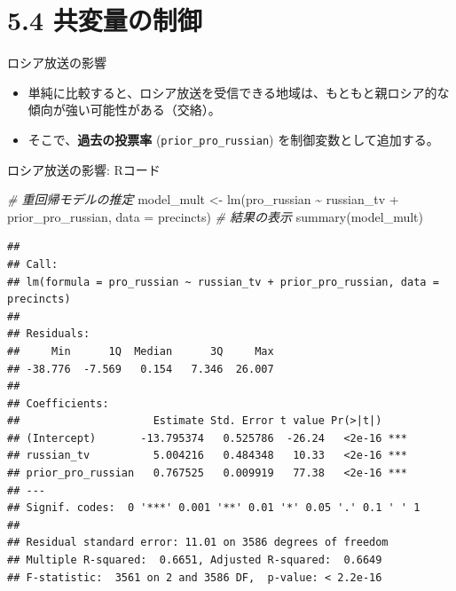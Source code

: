 \documentclass[
  ignorenonframetext,
]{beamer}
\newenvironment{Shaded}{\begin{snugshade}}{\end{snugshade}}
\newcommand{\AttributeTok}[1]{\textcolor[rgb]{0.77,0.63,0.00}{#1}}
\newcommand{\CommentTok}[1]{\textcolor[rgb]{0.56,0.35,0.01}{\textit{#1}}}
\newcommand{\FunctionTok}[1]{\textcolor[rgb]{0.00,0.00,0.00}{#1}}
\newcommand{\NormalTok}[1]{#1}
\newcommand{\OtherTok}[1]{\textcolor[rgb]{0.56,0.35,0.01}{#1}}
\newcommand{\SpecialCharTok}[1]{\textcolor[rgb]{0.00,0.00,0.00}{#1}}
\providecommand{\tightlist}{%
  \setlength{\itemsep}{0pt}\setlength{\parskip}{0pt}}
\begin{document}
\hypertarget{ux5171ux5909ux91cfux306eux5236ux5fa1}{%
\section{5.4 共変量の制御}\label{ux5171ux5909ux91cfux306eux5236ux5fa1}}

\begin{frame}[fragile]{ロシア放送の影響}
\protect\hypertarget{ux30edux30b7ux30a2ux653eux9001ux306eux5f71ux97ff}{}
\begin{itemize}
\tightlist
\item
  単純に比較すると、ロシア放送を受信できる地域は、もともと親ロシア的な傾向が強い可能性がある（交絡）。
\item
  そこで、\textbf{過去の投票率} (\texttt{prior\_pro\_russian})
  を制御変数として追加する。
\end{itemize}
\end{frame}

\begin{frame}[fragile]{ロシア放送の影響: Rコード}
\protect\hypertarget{ux30edux30b7ux30a2ux653eux9001ux306eux5f71ux97ff-rux30b3ux30fcux30c9}{}
\footnotesize

\begin{Shaded}
\begin{Highlighting}[]
\CommentTok{\# 重回帰モデルの推定}
\NormalTok{model\_mult }\OtherTok{\textless{}{-}} \FunctionTok{lm}\NormalTok{(pro\_russian }\SpecialCharTok{\textasciitilde{}}\NormalTok{ russian\_tv }\SpecialCharTok{+}\NormalTok{ prior\_pro\_russian, }
                 \AttributeTok{data =}\NormalTok{ precincts)}
\CommentTok{\# 結果の表示}
\FunctionTok{summary}\NormalTok{(model\_mult)}
\end{Highlighting}
\end{Shaded}

\begin{verbatim}
## 
## Call:
## lm(formula = pro_russian ~ russian_tv + prior_pro_russian, data = precincts)
## 
## Residuals:
##     Min      1Q  Median      3Q     Max 
## -38.776  -7.569   0.154   7.346  26.007 
## 
## Coefficients:
##                     Estimate Std. Error t value Pr(>|t|)    
## (Intercept)       -13.795374   0.525786  -26.24   <2e-16 ***
## russian_tv          5.004216   0.484348   10.33   <2e-16 ***
## prior_pro_russian   0.767525   0.009919   77.38   <2e-16 ***
## ---
## Signif. codes:  0 '***' 0.001 '**' 0.01 '*' 0.05 '.' 0.1 ' ' 1
## 
## Residual standard error: 11.01 on 3586 degrees of freedom
## Multiple R-squared:  0.6651, Adjusted R-squared:  0.6649 
## F-statistic:  3561 on 2 and 3586 DF,  p-value: < 2.2e-16
\end{verbatim}

\normalsize
\end{frame}
\end{document}
